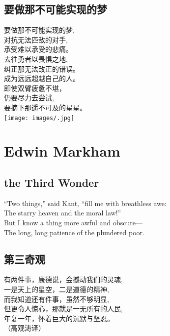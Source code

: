 \documentclass[
]{book}
\renewenvironment{quote}{\begin{VF}}{\end{VF}}
\begin{document}
\hypertarget{section-55}{%
\section{要做那不可能实现的梦}\label{section-55}}

\begin{quote}
要做那不可能实现的梦,\\
对抗无法匹敌的对手,\\
承受难以承受的悲痛。\\
去往勇者以畏惧之地,\\
纠正那无法改正的错误。\\
成为远远超越自己的人。\\
即使双臂疲惫不堪，\\
仍要尽力去尝试,\\
要摘下那遥不可及的星星。\\
\texttt{[image: images/.jpg]}
\end{quote}

\hypertarget{edwin-markham}{%
\chapter{Edwin Markham}\label{edwin-markham}}

\hypertarget{the-third-wonder}{%
\section{the Third Wonder}\label{the-third-wonder}}

\begin{quote}
``Two things,'' said Kant, ``fill me with breathless awe:\\
The starry heaven and the moral law!''\\
But I know a thing more awful and obscure---\\
The long, long patience of the plundered poor.
\end{quote}

\hypertarget{section-56}{%
\section{第三奇观}\label{section-56}}

\begin{quote}
有两件事，康德说，会撼动我们的灵魂,\\
一是天上的星空，二是道德的精神,\\
而我知道还有件事，虽然不够明显,\\
但更令人惊心，那就是一无所有的人民,\\
年复一年，怀着巨大的沉默与坚忍。\\
（高观涛译）
\end{quote}
\end{document}

